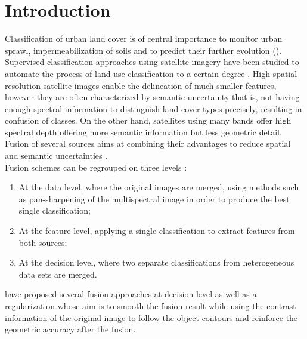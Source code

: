 \documentclass[10pt]{article}
\begin{document}
\makeMATIS


\tableofcontents
\newpage
\section{Introduction}

Classification of urban land cover is of central importance to monitor urban sprawl, impermeabilization of soils and to predict their further evolution (\cite{kurtz_histogram_2012,kurtz_extraction_2012,wemmert_multiresolution_2009}). Supervised classification approaches using satellite imagery have been studied to automate the process of land use classification to a certain degree  \parencite{inglada_operational_2017,li_urban_2016}. High spatial resolution satellite images enable the delineation of much smaller features, however they are often characterized by semantic uncertainty that is, not having enough spectral information to distinguish land cover types precisely, resulting in confusion of classes. On the other hand, satellites using many bands offer high spectral depth offering more semantic information but less geometric detail. Fusion of several sources aims at combining their advantages to reduce spatial and semantic uncertainties \parencite{ouerghemmi_two-step_2017,fauvel_decision_fusion,hervieu_fusion_2016}. \\

Fusion schemes can be regrouped on three levels \parencite{ouerghemmi_two-step_2017}:
\begin{enumerate}
    \item At the data level, where the original images are merged, using methods such as pan-sharpening of the multispectral image in order to produce the best single classification;
    \item At the feature level, applying a single classification to extract features from both sources;
    \item At the decision level, where two separate classifications from heterogeneous data sets are merged.
\end{enumerate}

\cite{ouerghemmi_two-step_2017} have proposed several fusion approaches at decision level as well as a regularization whose aim is to smooth the fusion result while using the contrast information of the original image to follow the object contours and reinforce the geometric accuracy after the fusion. \\
\end{document}
